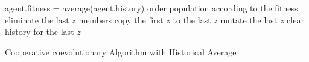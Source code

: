 \begin{algorithm}[th]
 \SetAlgoLined
 {
   {
   	   agent.fitness = average(agent.history) \;
   }
 	order population according to the fitness\;
 	eliminate the last $z$ members\;
 	copy the first $z$ to the last $z$\;
 	mutate the last $z$\;
 	clear history for the last $z$\;
 }
 
\caption{Cooperative coevolutionary Algorithm with Historical Average}
\label{Alg:CCEA-AA}
\end{algorithm}





